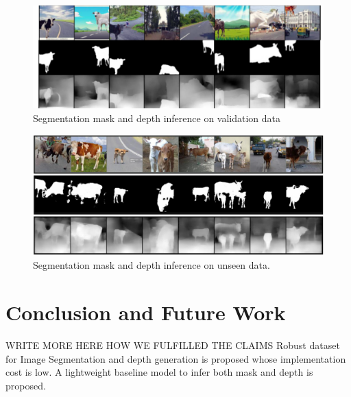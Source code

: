 \documentclass[review]{cvpr}
\begin{document}
\begin{figure}
  \begin{center}
    \includegraphics[width=1\textwidth]{validinference.png}
  \end{center}
  \caption{Segmentation mask and depth inference on validation data}
  \label{fig:validinfer}
\end{figure}


\begin{figure}
  \begin{center}
    \includegraphics[width=1\textwidth]{unseeninference.png}
  \end{center}
  \caption{Segmentation mask and depth inference on unseen data.}
  \label{fig:unseeninfer}
\end{figure}

\section{Conclusion and Future Work}
WRITE MORE HERE HOW WE FULFILLED THE CLAIMS
Robust dataset for Image Segmentation and depth generation is proposed whose implementation cost is low.
A lightweight baseline model to infer both mask and depth is proposed.
\end{document}
